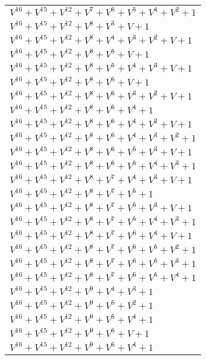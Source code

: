 \documentclass[12pt]{article}
\begin{document}
\begin{adjustwidth}{-4cm}{}
\begin{center}
\begin{longtable}{|l|}
$V^{16}  +V^{15}  +V^{12}  +V^{7}  +V^{6}  +V^{5}  +V^{4}  +V^{2}  + 1$ \\
$V^{16}  +V^{15}  +V^{12}  +V^{8}  +V^{3}  + V + 1$ \\
$V^{16}  +V^{15}  +V^{12}  +V^{8}  +V^{4}  +V^{3}  +V^{2}  + V + 1$ \\
$V^{16}  +V^{15}  +V^{12}  +V^{8}  +V^{5}  + V + 1$ \\
$V^{16}  +V^{15}  +V^{12}  +V^{8}  +V^{5}  +V^{4}  +V^{3}  + V + 1$ \\
$V^{16}  +V^{15}  +V^{12}  +V^{8}  +V^{6}  + V + 1$ \\
$V^{16}  +V^{15}  +V^{12}  +V^{8}  +V^{6}  +V^{3}  +V^{2}  + V + 1$ \\
$V^{16}  +V^{15}  +V^{12}  +V^{8}  +V^{6}  +V^{4}  + 1$ \\
$V^{16}  +V^{15}  +V^{12}  +V^{8}  +V^{6}  +V^{4}  +V^{2}  + V + 1$ \\
$V^{16}  +V^{15}  +V^{12}  +V^{8}  +V^{6}  +V^{4}  +V^{3}  +V^{2}  + 1$ \\
$V^{16}  +V^{15}  +V^{12}  +V^{8}  +V^{6}  +V^{5}  +V^{3}  + V + 1$ \\
$V^{16}  +V^{15}  +V^{12}  +V^{8}  +V^{6}  +V^{5}  +V^{4}  +V^{3}  + 1$ \\
$V^{16}  +V^{15}  +V^{12}  +V^{8}  +V^{7}  +V^{4}  +V^{3}  + V + 1$ \\
$V^{16}  +V^{15}  +V^{12}  +V^{8}  +V^{7}  +V^{5}  + 1$ \\
$V^{16}  +V^{15}  +V^{12}  +V^{8}  +V^{7}  +V^{5}  +V^{3}  + V + 1$ \\
$V^{16}  +V^{15}  +V^{12}  +V^{8}  +V^{7}  +V^{5}  +V^{4}  +V^{3}  + 1$ \\
$V^{16}  +V^{15}  +V^{12}  +V^{8}  +V^{7}  +V^{6}  +V^{4}  + V + 1$ \\
$V^{16}  +V^{15}  +V^{12}  +V^{8}  +V^{7}  +V^{6}  +V^{5}  +V^{2}  + 1$ \\
$V^{16}  +V^{15}  +V^{12}  +V^{8}  +V^{7}  +V^{6}  +V^{5}  +V^{3}  + 1$ \\
$V^{16}  +V^{15}  +V^{12}  +V^{8}  +V^{7}  +V^{6}  +V^{5}  +V^{4}  + 1$ \\
$V^{16}  +V^{15}  +V^{12}  +V^{9}  +V^{4}  +V^{3}  + 1$ \\
$V^{16}  +V^{15}  +V^{12}  +V^{9}  +V^{5}  +V^{2}  + 1$ \\
$V^{16}  +V^{15}  +V^{12}  +V^{9}  +V^{5}  +V^{4}  + 1$ \\
$V^{16}  +V^{15}  +V^{12}  +V^{9}  +V^{6}  + V + 1$ \\
$V^{16}  +V^{15}  +V^{12}  +V^{9}  +V^{6}  +V^{4}  + 1$ \\

\end{longtable}
\end{center}
\end{adjustwidth}
\end{document}

